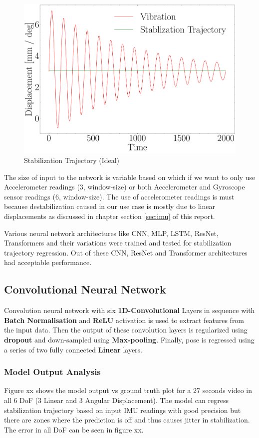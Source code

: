 \begin{figure}
    \centering
    \includegraphics[scale=0.25]{images/fig_chapter2/stab_traj_ideal.pdf}
    \caption{Stabilization Trajectory (Ideal)}
    \label{fig:stab_traj_ideal}
\end{figure}

The size of input to the network is variable based on which if we want to only use Accelerometer readings (3, window-size) or both Accelerometer and Gyroscope sensor readings (6, window-size). The use of accelerometer readings is must because destabilization caused in our use case is mostly due to linear displacements as discussed in chapter section \ref{sec:imu} of this report. 

Various neural network architectures like CNN, MLP, LSTM, ResNet, Transformers and their variations were trained and tested for stabilization trajectory regression. Out of these CNN, ResNet and Transformer architectures had acceptable performance. 

\subsection{Convolutional Neural Network}
Convolution neural network with six \textbf{1D-Convolutional} Layers in sequence with \textbf{Batch Normalisation} and  \textbf{ReLU} activation is used to extract features from the input data. Then the output of these convolution layers is regularized using \textbf{dropout} and down-sampled using \textbf{Max-pooling}. Finally, pose is regressed using a series of two fully connected \textbf{Linear} layers.

\subsubsection{Model Output Analysis}
Figure xx shows the model output vs ground truth plot for a 27 seconds video in all 6 DoF (3 Linear and 3 Angular Displacement). The model can regress stabilization trajectory based on input IMU readings with good precision but there are zones where the prediction is off and thus causes jitter in stabilization. The error in all DoF can be seen in figure xx.


